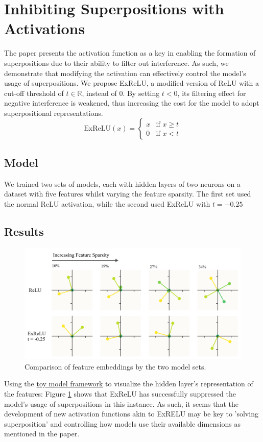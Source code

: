 \section{Inhibiting Superpositions with Activations}
\label{sec:act_fns}
The paper presents the activation function as a key in enabling the formation of superpositions due to their ability to 
filter out interference. As such, we demonstrate that modifying the activation can effectively control the model's usage of
superpositions. 
\newline
We propose ExReLU, a modified version of ReLU with a cut-off threshold of $t \in \mathbb{R}$, instead of $0$. By setting $t < 0$, its filtering effect for negative interference is weakened, thus
increasing the cost for the model to adopt superpositional representations.
\[
\text{ExReLU}(x) =
    \begin{cases}
        x & \text{if } x \geq t\\
        0 & \text{if } x < t
    \end{cases}
\] 

\subsection{Model}
We trained two sets of models, each with hidden layers of two neurons on a dataset with five features whilst varying the feature
sparsity. The first set used the normal ReLU activation, while the second used ExReLU with $t=-0.25$

\subsection{Results}
\begin{figure}[h]
	\centering
	\includegraphics[width=1\linewidth]{figures/acts_diagram.png}
	\caption{Comparison of feature embeddings by the two model sets.}
	\label{fig:acts_diagram}
\end{figure}
Using the \href{https://colab.research.google.com/github/anthropics/toy-models-of-superposition/blob/main/toy_models.ipynb}{toy model framework} to visualize the hidden layer's representation of the features:
Figure \ref{fig:acts_diagram} shows that ExReLU has successfully suppressed the model's usage of superpositions in this instance.
As such, it seems that the development of new activation functions akin to ExRELU may be key to 'solving superposition' and controlling how models 
use their available dimensions as mentioned in the paper.